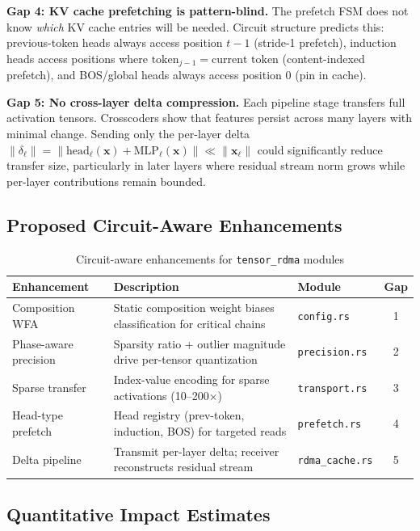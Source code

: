\documentclass[11pt,letterpaper]{article}
\theoremstyle{definition}
\begin{document}
\textbf{Gap 4: KV cache prefetching is pattern-blind.} The prefetch FSM does not know \emph{which} KV cache entries will be needed. Circuit structure predicts this: previous-token heads always access position $t-1$ (stride-1 prefetch), induction heads access positions where $\text{token}_{j-1} = \text{current token}$ (content-indexed prefetch), and BOS/global heads always access position 0 (pin in cache).

\textbf{Gap 5: No cross-layer delta compression.} Each pipeline stage transfers full activation tensors. Crosscoders show that features persist across many layers with minimal change. Sending only the per-layer delta $\|\delta_\ell\| = \|\text{head}_\ell(\mathbf{x}) + \text{MLP}_\ell(\mathbf{x})\| \ll \|\mathbf{x}_\ell\|$ could significantly reduce transfer size, particularly in later layers where residual stream norm grows while per-layer contributions remain bounded.

\subsection{Proposed Circuit-Aware Enhancements}

\begin{table}[htbp]
\centering
\caption{Circuit-aware enhancements for \texttt{tensor\_rdma} modules}
\label{tab:circuit-enhancements}
\footnotesize
\begin{tabular}{@{}p{2.6cm}p{5.8cm}p{2.2cm}c@{}}
\toprule
\textbf{Enhancement} & \textbf{Description} & \textbf{Module} & \textbf{Gap} \\
\midrule
Composition WFA & Static composition weight biases classification for critical chains & \texttt{config.rs} & 1 \\
Phase-aware precision & Sparsity ratio + outlier magnitude drive per-tensor quantization & \texttt{precision.rs} & 2 \\
Sparse transfer & Index-value encoding for sparse activations (10--200$\times$) & \texttt{transport.rs} & 3 \\
Head-type prefetch & Head registry (prev-token, induction, BOS) for targeted reads & \texttt{prefetch.rs} & 4 \\
Delta pipeline & Transmit per-layer delta; receiver reconstructs residual stream & \texttt{rdma\_cache.rs} & 5 \\
\bottomrule
\end{tabular}
\end{table}

\subsection{Quantitative Impact Estimates}
\end{document}
